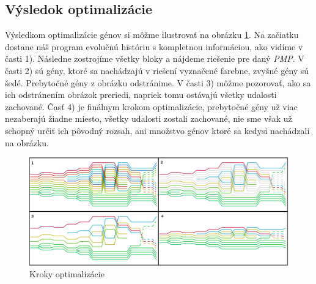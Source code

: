 \subsection{Výsledok optimalizácie}
Výsledkom optimalizácie génov si môžme ilustrovať na obrázku \ref{obr:opt}.
Na začiatku dostane náš program evolučnú históriu s kompletnou informáciou, ako vidíme v časti 1).
Následne zostrojíme všetky bloky a nájdeme riešenie pre daný \emph{PMP}.
V časti 2) sú gény, ktoré sa nachádzajú v riešení vyznačené farebne, zvyšné gény sú šedé.
Prebytočné gény z obrázku odstránime. V časti 3) môžme pozorovať, ako sa ich odstránením obrázok preriedi, 
napriek tomu ostávajú všetky udalosti zachované.
Časť 4) je finálnym krokom optimalizácie, prebytočné gény už viac nezaberajú žiadne miesto, všetky udalosti zostali zachované,
nie sme však už schopný určiť ich pôvodný rozsah, ani množstvo génov ktoré sa kedysi nachádzali na obrázku.
\begin{figure}[t]
 \centering
\includegraphics[width=1.1\textwidth]{images/optimalizacia}
\caption{Kroky optimalizácie}\label{obr:opt}
\end{figure}

